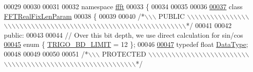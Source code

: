 \begin{DoxyCode}
00029 
00030 
00031 
00032 \textcolor{keyword}{namespace }\hyperlink{a00142}{ffft}
00033 \{
00034 
00035 
00036 
\hypertarget{a00099_source_l00037}{}\hyperlink{a00012}{00037} \textcolor{keyword}{class }\hyperlink{a00012}{FFTRealFixLenParam}
00038 \{
00039 
00040 \textcolor{comment}{/*\(\backslash\)\(\backslash\)\(\backslash\) PUBLIC \(\backslash\)\(\backslash\)\(\backslash\)\(\backslash\)\(\backslash\)\(\backslash\)\(\backslash\)\(\backslash\)\(\backslash\)\(\backslash\)\(\backslash\)\(\backslash\)\(\backslash\)\(\backslash\)\(\backslash\)\(\backslash\)\(\backslash\)\(\backslash\)\(\backslash\)\(\backslash\)\(\backslash\)\(\backslash\)\(\backslash\)\(\backslash\)\(\backslash\)\(\backslash\)\(\backslash\)\(\backslash\)\(\backslash\)\(\backslash\)\(\backslash\)\(\backslash\)\(\backslash\)\(\backslash\)\(\backslash\)\(\backslash\)\(\backslash\)\(\backslash\)\(\backslash\)\(\backslash\)\(\backslash\)\(\backslash\)\(\backslash\)\(\backslash\)\(\backslash\)\(\backslash\)\(\backslash\)\(\backslash\)\(\backslash\)\(\backslash\)\(\backslash\)\(\backslash\)\(\backslash\)\(\backslash\)\(\backslash\)\(\backslash\)\(\backslash\)\(\backslash\)\(\backslash\)\(\backslash\)\(\backslash\)\(\backslash\)\(\backslash\)*/}
00041 
00042 \textcolor{keyword}{public}:
00043 
00044    \textcolor{comment}{// Over this bit depth, we use direct calculation for sin/cos}
\hypertarget{a00099_source_l00045}{}\hyperlink{a00012_a7a7b234f07dec3342f211f70fc354249acc7080c97a1906e1284b5c5b467bf068}{00045}    \textcolor{keyword}{enum} \{         \hyperlink{a00012_a7a7b234f07dec3342f211f70fc354249acc7080c97a1906e1284b5c5b467bf068}{TRIGO\_BD\_LIMIT}  = 12  \};
00046 
\hypertarget{a00099_source_l00047}{}\hyperlink{a00012_a119afb4512058be9d19dc6069cb3c19b}{00047}     \textcolor{keyword}{typedef} \textcolor{keywordtype}{float}   \hyperlink{a00012_a119afb4512058be9d19dc6069cb3c19b}{DataType};
00048 
00049 
00050 
00051 \textcolor{comment}{/*\(\backslash\)\(\backslash\)\(\backslash\) PROTECTED \(\backslash\)\(\backslash\)\(\backslash\)\(\backslash\)\(\backslash\)\(\backslash\)\(\backslash\)\(\backslash\)\(\backslash\)\(\backslash\)\(\backslash\)\(\backslash\)\(\backslash\)\(\backslash\)\(\backslash\)\(\backslash\)\(\backslash\)\(\backslash\)\(\backslash\)\(\backslash\)\(\backslash\)\(\backslash\)\(\backslash\)\(\backslash\)\(\backslash\)\(\backslash\)\(\backslash\)\(\backslash\)\(\backslash\)\(\backslash\)\(\backslash\)\(\backslash\)\(\backslash\)\(\backslash\)\(\backslash\)\(\backslash\)\(\backslash\)\(\backslash\)\(\backslash\)\(\backslash\)\(\backslash\)\(\backslash\)\(\backslash\)\(\backslash\)\(\backslash\)\(\backslash\)\(\backslash\)\(\backslash\)\(\backslash\)\(\backslash\)\(\backslash\)\(\backslash\)\(\backslash\)\(\backslash\)\(\backslash\)\(\backslash\)\(\backslash\)\(\backslash\)\(\backslash\)\(\backslash\)*/}

\end{DoxyCode}
